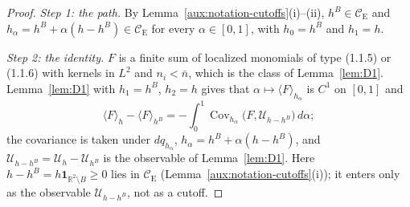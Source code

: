 \documentclass[11pt,a4paper]{article}
\theoremstyle{plain}
\theoremstyle{definition}
\theoremstyle{plain}
\theoremstyle{definition}
\newcommand{\R}{\mathbb{R}}
\newcommand{\CE}{\mathcal{C}_{\mathrm E}}
\DeclareMathOperator{\Cov}{Cov}
\newcommand{\ev}[2]{\langle #1\rangle_{#2}}            %
\newcommand{\Uc}{\mathcal U}
\begin{document}
\begin{proof}
\emph{Step 1: the path.}  By Lemma~\ref{aux:notation-cutoffs}(i)--(ii), $h^B\in\CE$ and
$h_\alpha=h^B+\alpha(h-h^B)\in\CE$ for every $\alpha\in[0,1]$, with $h_0=h^B$ and $h_1=h$.

\emph{Step 2: the identity.}  $F$ is a finite sum of localized monomials of type (1.1.5) or
(1.1.6) with kernels in $L^2$ and $n_i<\bar n$, which is the class of Lemma~\ref{lem:D1}.
Lemma~\ref{lem:D1} with $h_1=h^B$, $h_2=h$ gives that $\alpha\mapsto\ev{F}{h_\alpha}$ is $C^1$
on $[0,1]$ and
\[
 \ev{F}{h}-\ev{F}{h^B}=-\int_0^1\Cov_{h_\alpha}\bigl(F,\Uc_{h-h^B}\bigr)\,d\alpha ;
\]
the covariance is taken under $dq_{h_\alpha}$, $h_\alpha=h^B+\alpha(h-h^B)$, and
$\Uc_{h-h^B}=\Uc_h-\Uc_{h^B}$ is the observable of Lemma~\ref{lem:D1}.  Here
$h-h^B=h\mathbf 1_{\R^2\setminus B}\ge0$ lies in $\CE$ (Lemma~\ref{aux:notation-cutoffs}(i)); it
enters only as the observable $\Uc_{h-h^B}$, not as a cutoff.


\end{proof}
\end{document}
